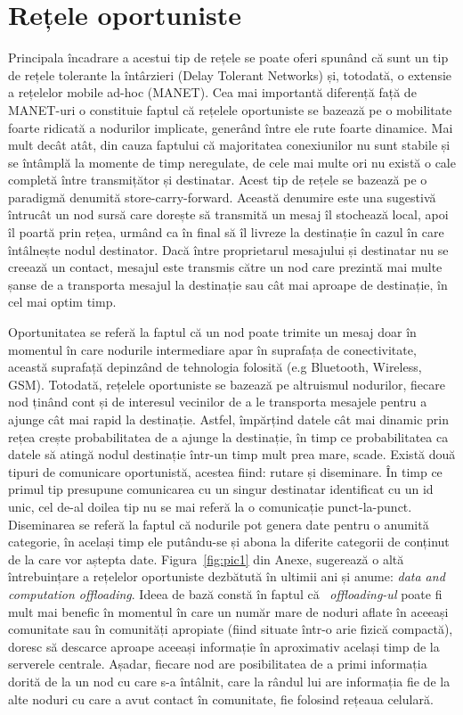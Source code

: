 \documentclass[12pt,a4paper]{report}
\begin{document}
\section{Rețele oportuniste} \label{reteleOportuniste}
Principala încadrare a acestui tip de rețele se poate oferi spunând că sunt un tip de rețele tolerante la întârzieri (Delay Tolerant Networks) și, totodată, o extensie a rețelelor mobile ad-hoc (MANET). Cea mai importantă diferență față de MANET-uri o constituie faptul că rețelele oportuniste se bazează pe o mobilitate foarte ridicată a nodurilor implicate, generând între ele rute foarte dinamice. Mai mult decât atât, din cauza faptului că majoritatea conexiunilor nu sunt stabile și se întâmplă la momente de timp neregulate, de cele mai multe ori nu există o cale completă între transmițător și destinatar. Acest tip de rețele se bazează pe o paradigmă denumită store-carry-forward. Această denumire este una sugestivă întrucât un nod sursă care dorește să transmită un mesaj îl stochează local, apoi îl poartă prin rețea, urmând ca în final să îl livreze la destinație în cazul în care întâlnește nodul destinator. Dacă între proprietarul mesajului și destinatar nu se creează un contact, mesajul este transmis către un nod care prezintă mai multe șanse de a transporta mesajul la destinație sau cât mai aproape de destinație, în cel mai optim timp.

Oportunitatea se referă la faptul că un nod poate trimite un mesaj doar în momentul în care nodurile intermediare apar în suprafața de conectivitate, această suprafață depinzând de tehnologia folosită (e.g Bluetooth, Wireless, GSM). Totodată, rețelele oportuniste se bazează pe altruismul nodurilor, fiecare nod ținând cont și de interesul vecinilor de a le transporta mesajele pentru a ajunge cât mai rapid la destinație. Astfel, împărțind datele cât mai dinamic prin rețea crește probabilitatea de a ajunge la destinație, în timp ce probabilitatea ca datele să atingă nodul destinație într-un timp mult prea mare, scade. Există două tipuri de comunicare oportunistă, acestea fiind: rutare și diseminare. În timp ce primul tip presupune comunicarea cu un singur destinatar identificat cu un id unic, cel de-al doilea tip nu se mai referă la o comunicație punct-la-punct. Diseminarea se referă la faptul că nodurile pot genera date pentru o anumită categorie, în același timp ele putându-se și abona la diferite categorii de conținut de la care vor aștepta date. 
Figura~\ref{fig:pic1} din Anexe, sugerează o altă întrebuințare a rețelelor oportuniste dezbătută în ultimii ani și anume: \textit{data and computation offloading}.
Ideea de bază constă în faptul că ~\textit{offloading-ul} poate fi mult mai benefic în momentul în care un număr mare de noduri aflate în aceeași comunitate sau în comunități apropiate (fiind situate într-o arie fizică compactă), doresc să descarce aproape aceeași informație în aproximativ același timp de la serverele centrale. Așadar, fiecare nod are posibilitatea de a primi informația dorită de la un nod cu care s-a întâlnit, care la rândul lui are informația fie de la alte noduri cu care a avut contact în comunitate, fie folosind rețeaua celulară.
\end{document}
